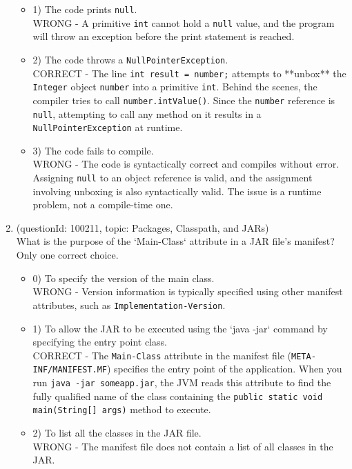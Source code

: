 \documentclass[12pt]{article}
\begin{document}
\begin{enumerate}[label=(\arabic*)]
\begin{itemize}
\item 1) The code prints \verb|null|.
 \\ 
WRONG - A primitive \verb|int| cannot hold a \verb|null| value, and the program will throw an exception before the print statement is reached.

\item 2) The code throws a \verb|NullPointerException|.
 \\ 
CORRECT - The line \verb|int result = number;| attempts to **unbox** the \verb|Integer| object \verb|number| into a primitive \verb|int|. Behind the scenes, the compiler tries to call \verb|number.intValue()|. Since the \verb|number| reference is \verb|null|, attempting to call any method on it results in a \verb|NullPointerException| at runtime.

\item 3) The code fails to compile.
 \\ 
WRONG - The code is syntactically correct and compiles without error. Assigning \verb|null| to an object reference is valid, and the assignment involving unboxing is also syntactically valid. The issue is a runtime problem, not a compile-time one.

\end{itemize}
\item (questionId: 100211, topic: Packages, Classpath, and JARs) \\ 
What is the purpose of the `Main-Class` attribute in a JAR file's manifest?
\\ \noindent Only one correct choice. 
\begin{itemize}
\item 0) To specify the version of the main class.
 \\ 
WRONG - Version information is typically specified using other manifest attributes, such as \verb|Implementation-Version|.

\item 1) To allow the JAR to be executed using the `java -jar` command by specifying the entry point class.
 \\ 
CORRECT - The \verb|Main-Class| attribute in the manifest file (\verb|META-INF/MANIFEST.MF|) specifies the entry point of the application. When you run \verb|java -jar someapp.jar|, the JVM reads this attribute to find the fully qualified name of the class containing the \verb|public static void main(String[] args)| method to execute.

\item 2) To list all the classes in the JAR file.
 \\ 
WRONG - The manifest file does not contain a list of all classes in the JAR.


\end{itemize}
\end{enumerate}
\end{document}
